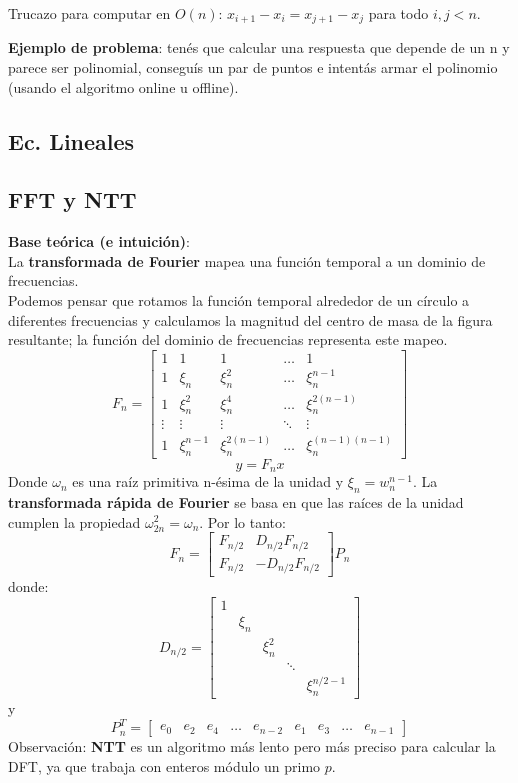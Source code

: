 {Trucazo para computar en \(O(n)\): \(x_{i + 1} - x_i = x_{j + 1} - x_j\) para todo \(i, j < n\).

\textbf{Ejemplo de problema}: tenés que calcular una respuesta que depende de un n y parece ser polinomial, conseguís un par de puntos e 
intentás armar el polinomio (usando el algoritmo online u offline).

\subsection{Ec. Lineales}

\subsection{FFT y NTT}
\textbf{Base teórica (e intuición)}: \\
La \textbf{transformada de Fourier} mapea una función temporal a un dominio de frecuencias. \\
Podemos pensar que rotamos la función temporal alrededor de un círculo a diferentes frecuencias y
calculamos la magnitud del centro de masa de la figura resultante; la función del dominio de 
frecuencias representa este mapeo. \\
\[
    F_n = 
    \begin{bmatrix}
        1 & 1 & 1 & \ldots & 1 \\
        1 & \xi_n & \xi_n^2 & \dots & \xi_n^{n-1} \\
        1 & \xi_n^2 & \xi_n^4 & \dots & \xi_n^{2(n-1)} \\
        \vdots & \vdots & \vdots & \ddots & \vdots \\
        1 & \xi_n^{n-1} & \xi_n^{2(n-1)} & \dots & \xi_n^{(n-1)(n-1)}
    \end{bmatrix}
\]
\[
    y = F_nx
\]
Donde $\omega_n$ es una raíz primitiva n-ésima de la unidad y $\xi_n = w_n^{n-1}$.
La \textbf{transformada rápida de Fourier} se basa en que las raíces de la unidad cumplen la propiedad $ \omega_{2n}^{2} = \omega_{n} $. Por lo tanto:
\[
    F_n = 
    \begin{bmatrix}
        F_{n/2} & D_{n/2}F_{n/2} \\
        F_{n/2} & -D_{n/2}F_{n/2}
    \end{bmatrix}
    P_n 
\]
donde: 
\[
    D_{n/2} = 
    \begin{bmatrix}
        1 \\
        & \xi_n \\
        & & \xi_n^2 \\
        & & & \ddots \\
        & & & & \xi_n^{n/2-1}
    \end{bmatrix}
\]
    y
\[
    P_n^T = 
    \begin{bmatrix}
        e_0 & e_2 & e_4 & \ldots & e_{n-2} & e_1 & e_3 & \ldots & e_{n-1}
    \end{bmatrix}
\] 
Observación: \textbf{NTT} es un algoritmo más lento pero más preciso para calcular la DFT,
ya que trabaja con enteros módulo un primo $p$. \\

}
